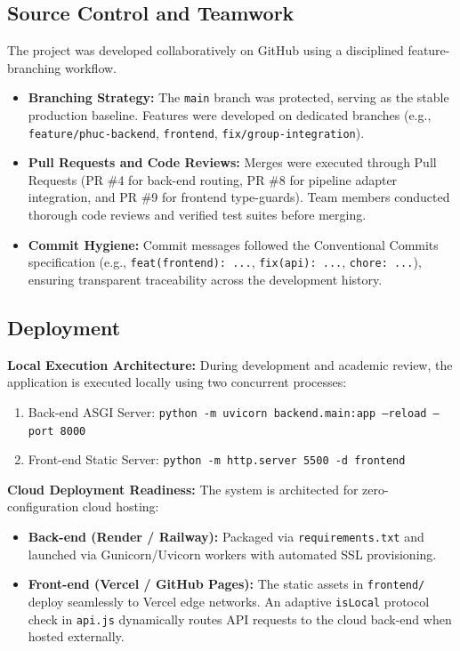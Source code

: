 \subsection{Source Control and Teamwork}
The project was developed collaboratively on GitHub using a disciplined feature-branching workflow. 
\begin{itemize}
  \item \textbf{Branching Strategy:} The \texttt{main} branch was protected, serving as the stable production baseline. Features were developed on dedicated branches (e.g., \texttt{feature/phuc-backend}, \texttt{frontend}, \texttt{fix/group-integration}).
  \item \textbf{Pull Requests and Code Reviews:} Merges were executed through Pull Requests (PR \#4 for back-end routing, PR \#8 for pipeline adapter integration, and PR \#9 for frontend type-guards). Team members conducted thorough code reviews and verified test suites before merging.
  \item \textbf{Commit Hygiene:} Commit messages followed the Conventional Commits specification (e.g., \texttt{feat(frontend): ...}, \texttt{fix(api): ...}, \texttt{chore: ...}), ensuring transparent traceability across the development history.
\end{itemize}

\subsection{Deployment}
\textbf{Local Execution Architecture:}
During development and academic review, the application is executed locally using two concurrent processes:
\begin{enumerate}
  \item Back-end ASGI Server: \texttt{python -m uvicorn backend.main:app --reload --port 8000}
  \item Front-end Static Server: \texttt{python -m http.server 5500 -d frontend}
\end{enumerate}

\textbf{Cloud Deployment Readiness:}
The system is architected for zero-configuration cloud hosting:
\begin{itemize}
  \item \textbf{Back-end (Render / Railway):} Packaged via \texttt{requirements.txt} and launched via Gunicorn/Uvicorn workers with automated SSL provisioning.
  \item \textbf{Front-end (Vercel / GitHub Pages):} The static assets in \texttt{frontend/} deploy seamlessly to Vercel edge networks. An adaptive \texttt{isLocal} protocol check in \texttt{api.js} dynamically routes API requests to the cloud back-end when hosted externally.
\end{itemize}
